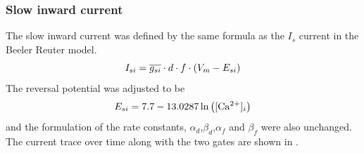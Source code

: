 \subsubsection{Slow inward current}
The slow inward current was defined by the same formula as the $I_s$ current
in the Beeler Reuter model.
\begin{equation}
  I_{si}=\overline{g_{si}}\cdot d\cdot f\cdot \left( V_m-E_{si} \right)
\end{equation}
The reversal potential was adjusted to be
\begin{equation}
  E_{si}=7.7-13.0287\ln\left(  [\mathrm{Ca^{2+}}]_{i}  \right)
\end{equation}
and the formulation of the rate constants, $\alpha_d$,$\beta_d$,$\alpha_f$
and $\beta_f$ were also unchanged. The current trace over time along with the
two gates are shown in .

